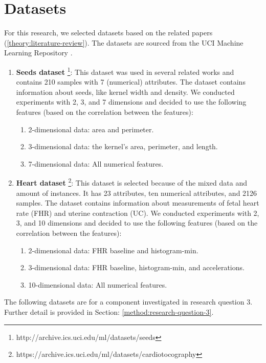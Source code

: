 \section{Datasets} \label{datasets-section}
For this research, we selected datasets based on the related papers (\ref{theory:literature-review}).
The datasets are sourced from the UCI Machine Learning Repository \citep{noauthor_uci_nodate}.
\begin{enumerate}
  \item \textbf{Seeds dataset} \footnote{http://archive.ics.uci.edu/ml/datasets/seeds}: This dataset was used in several related works and contains 210 samples with 7 (numerical) attributes.
        The dataset contains information about seeds, like kernel width and density.
        We conducted experiments with 2, 3, and 7 dimensions and decided to use the following features (based on the correlation between the features):
        \begin{enumerate}
          \item 2-dimensional data: area and perimeter.
          \item 3-dimensional data: the kernel's area, perimeter, and length.
          \item 7-dimensional data: All numerical features.
        \end{enumerate}
  \item \textbf{Heart dataset} \footnote{https://archive.ics.uci.edu/ml/datasets/cardiotocography}: This dataset is selected because of the mixed data and amount of instances.
        It has 23 attributes, ten numerical attributes, and 2126 samples.
        The dataset contains information about measurements of fetal heart rate (FHR) and uterine contraction (UC).
        We conducted experiments with 2, 3, and 10 dimensions and decided to use the following features (based on the correlation between the features):
        \begin{enumerate}
          \item 2-dimensional data: FHR baseline and histogram-min.
          \item 3-dimensional data: FHR baseline, histogram-min, and accelerations.
          \item 10-dimensional data: All numerical features.
        \end{enumerate}
\end{enumerate}
The following datasets are for a component investigated in research question 3.
Further detail is provided in Section: \ref{method:research-question-3}.
